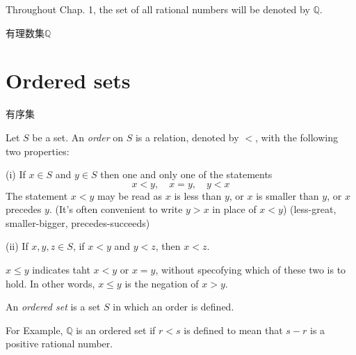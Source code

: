 
\begin{myDefinition}\label{myDefinitions:1.4}
Throughout Chap. 1, the set of all rational numbers will be denoted by $\mathbb{Q}$.
\end{myDefinition}

有理数集$\mathbb{Q}$

\section{Ordered sets}
有序集

\begin{myDefinition}\label{myDefinitions:1.5}
Let $S$ be a set. An \emph{order} on $S$ is a relation, denoted by $<$, with the following two properties:

(i) If $x\in S$ and $y\in S$ then one and only one of the statements
\begin{equation*}
    x<y, \quad
    x=y, \quad
    y<x
\end{equation*}
The statement $x<y$ may be read as 
$x$ is less than $y$, or 
$x$ is smaller than $y$, or
$x$ precedes $y$.
(It's often convenient to write $y>x$ in place of $x<y$)
(less-great, smaller-bigger, precedes-succeeds)

(ii) If $x,y,z\in S$, if $x<y$ and $y<z$, then $x<z$.

$x\leq y$ indicates taht $x<y$ or $x=y$, without specofying which of these two is to hold.
In other words, $x\leq y$ is the negation of $x>y$.
\end{myDefinition}



\begin{myDefinition}\label{myDefinitions:1.6}
An \emph{ordered set} is a set $S$ in which an order is defined.
\end{myDefinition}

For Example, $\mathbb{Q}$ is an ordered set if $r<s$ is defined to mean that $s-r$ is a positive rational number.

